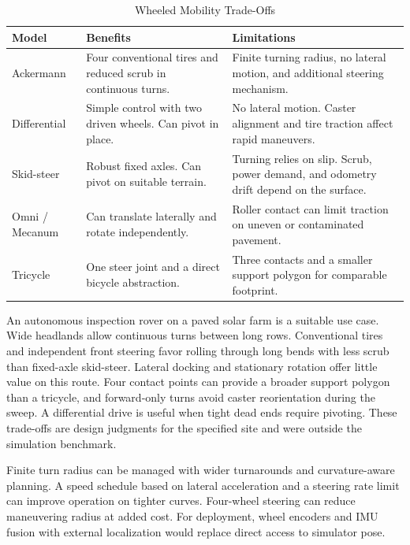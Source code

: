 \documentclass[conference]{IEEEtran}
\begin{document}
\begin{table}[t]
\caption{Wheeled Mobility Trade-Offs}
\label{tab:comparison}
\centering\small
\begin{tabular}{@{}>{\raggedright\arraybackslash}p{}
  >{\raggedright\arraybackslash}p{}
  >{\raggedright\arraybackslash}p{}@{}}
\hline
Model & Benefits & Limitations \\ \hline
Ackermann & Four conventional tires and reduced scrub in continuous turns. & Finite turning radius, no lateral motion, and additional steering mechanism. \\
Differential & Simple control with two driven wheels. Can pivot in place. & No lateral motion. Caster alignment and tire traction affect rapid maneuvers. \\
Skid-steer & Robust fixed axles. Can pivot on suitable terrain. & Turning relies on slip. Scrub, power demand, and odometry drift depend on the surface. \\
Omni / Mecanum & Can translate laterally and rotate independently. & Roller contact can limit traction on uneven or contaminated pavement. \\
Tricycle & One steer joint and a direct bicycle abstraction. & Three contacts and a smaller support polygon for comparable footprint. \\ \hline
\end{tabular}
\end{table}

An autonomous inspection rover on a paved solar farm is a suitable use case. Wide headlands allow continuous turns between long rows. Conventional tires and independent front steering favor rolling through long bends with less scrub than fixed-axle skid-steer. Lateral docking and stationary rotation offer little value on this route. Four contact points can provide a broader support polygon than a tricycle, and forward-only turns avoid caster reorientation during the sweep. A differential drive is useful when tight dead ends require pivoting. These trade-offs are design judgments for the specified site and were outside the simulation benchmark.

Finite turn radius can be managed with wider turnarounds and curvature-aware planning. A speed schedule based on lateral acceleration and a steering rate limit can improve operation on tighter curves. Four-wheel steering can reduce maneuvering radius at added cost. For deployment, wheel encoders and IMU fusion with external localization would replace direct access to simulator pose.
\end{document}
